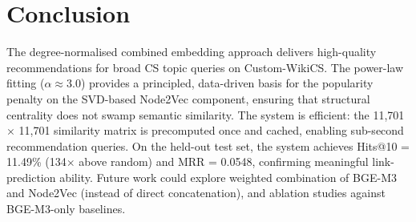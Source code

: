 \documentclass[12pt,a4paper]{article}
\begin{document}
\section{Conclusion}

The degree-normalised combined embedding approach delivers high-quality
recommendations for broad CS topic queries on Custom-WikiCS.  The power-law
fitting ($\alpha \approx 3.0$) provides a principled, data-driven basis
for the popularity penalty on the SVD-based Node2Vec component, ensuring that
structural centrality does not swamp semantic similarity.  The system is
efficient: the 11,701 $\times$ 11,701 similarity matrix is precomputed once
and cached, enabling sub-second recommendation queries.  On the held-out
test set, the system achieves Hits@10 = 11.49\% (134$\times$ above random)
and MRR = 0.0548, confirming meaningful link-prediction ability.  Future work
could explore weighted combination of BGE-M3 and Node2Vec (instead of
direct concatenation), and ablation studies against BGE-M3-only baselines.
\end{document}
